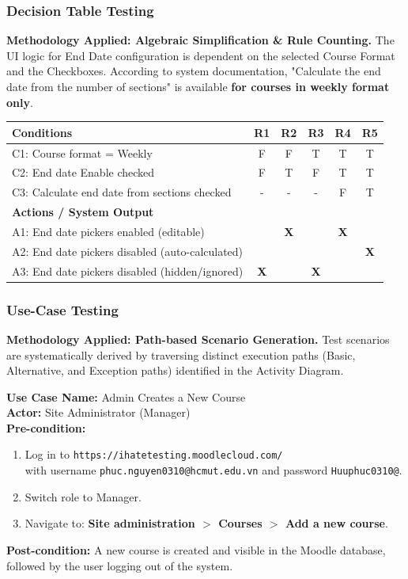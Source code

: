 \documentclass[twoside,final]{hcmut-report}
\begin{document}
\subsubsection{Decision Table Testing}
\textbf{Methodology Applied: Algebraic Simplification \& Rule Counting.} 
The UI logic for End Date configuration is dependent on the selected Course Format and the Checkboxes. According to system documentation, "Calculate the end date from the number of sections" is available \textbf{for courses in weekly format only}.

\begin{table}[H]
\centering
\renewcommand{\arraystretch}{1.2}
\begin{tabularx}{\textwidth}{|>{\raggedright\arraybackslash}X|c|c|c|c|c|}
\hline
\textbf{Conditions} & \textbf{R1} & \textbf{R2} & \textbf{R3} & \textbf{R4} & \textbf{R5} \\ \hline
C1: Course format = Weekly & F & F & T & T & T \\ \hline
C2: End date Enable checked & F & T & F & T & T \\ \hline
C3: Calculate end date from sections checked & - & - & - & F & T \\ \hline
\hline
\textbf{Actions / System Output} & & & & & \\ \hline
A1: End date pickers enabled (editable) & & \textbf{X} & & \textbf{X} & \\ \hline
A2: End date pickers disabled (auto-calculated) & & & & & \textbf{X} \\ \hline
A3: End date pickers disabled (hidden/ignored) & \textbf{X} & & \textbf{X} & & \\ \hline
\end{tabularx}
\end{table}

\subsubsection{Use-Case Testing}
\textbf{Methodology Applied: Path-based Scenario Generation.} 
Test scenarios are systematically derived by traversing distinct execution paths (Basic, Alternative, and Exception paths) identified in the Activity Diagram.

\vspace{0.2cm}
\noindent\textbf{Use Case Name:} Admin Creates a New Course \\
\textbf{Actor:} Site Administrator (Manager) \\
\textbf{Pre-condition:} 
\begin{enumerate}
    \item Log in to \texttt{https://ihatetesting.moodlecloud.com/}\\ with username \texttt{phuc.nguyen0310@hcmut.edu.vn} and password \texttt{Huuphuc0310@}.
    \item Switch role to Manager.
    \item Navigate to: \textbf{Site administration $>$ Courses $>$ Add a new course}.
\end{enumerate}
\textbf{Post-condition:} A new course is created and visible in the Moodle database, followed by the user logging out of the system.
\end{document}
